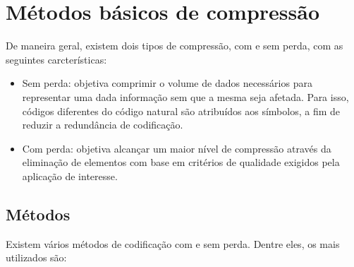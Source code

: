 \section{Métodos básicos de compressão}
\label{metodosdecompressao}

De maneira geral, existem dois tipos de compressão, com e sem perda, com as seguintes carcterísticas:

\begin{itemize}
\item Sem perda: objetiva comprimir o volume de dados necessários para representar uma dada informação sem que a mesma seja afetada. Para isso, códigos diferentes do código natural são atribuídos aos símbolos, a fim de reduzir a redundância de codificação. 

\item Com perda: objetiva alcançar um maior nível de compressão através da eliminação de elementos com base em critérios de qualidade exigidos pela aplicação de interesse.
\end{itemize}

\subsection{Métodos}
\label{metodos}

Existem vários métodos de codificação com e sem perda. Dentre eles, os mais utilizados são:

